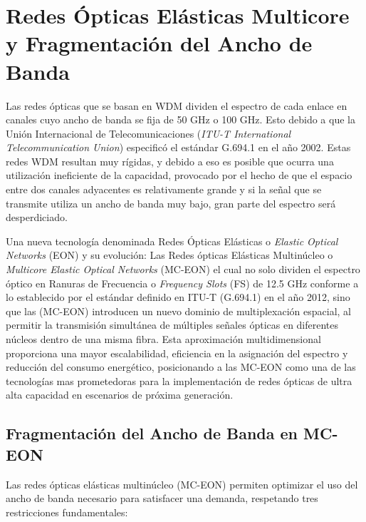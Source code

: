 \chapter{Redes Ópticas Elásticas Multicore y Fragmentación del Ancho de Banda}
Las redes ópticas que se basan en WDM dividen el espectro de cada enlace en canales cuyo ancho de banda se fija de 50 GHz o 100 GHz. Esto debido a que la Unión Internacional de Telecomunicaciones (\textit{ITU-T International Telecommunication Union}) especificó el estándar G.694.1 en el año 2002.
%
Estas redes WDM resultan muy rígidas, y debido a eso es posible que ocurra una utilización ineficiente de la capacidad, provocado por el hecho de que el espacio entre dos canales adyacentes es relativamente grande y si la señal que se transmite utiliza un ancho de banda muy bajo, gran parte del espectro será desperdiciado.
%

Una nueva tecnología denominada Redes Ópticas Elásticas o \textit{Elastic Optical Networks} (EON) y su evolución: Las Redes ópticas Elásticas Multinúcleo o \textit{Multicore Elastic Optical Networks} (MC-EON) el cual no solo dividen el espectro óptico en Ranuras de Frecuencia o \textit{Frequency Slots} (FS) de 12.5 GHz conforme a lo establecido por el estándar definido en ITU-T (G.694.1) en el año 2012, sino que las (MC-EON) introducen un nuevo dominio de multiplexación espacial, al permitir la transmisión simultánea de múltiples señales ópticas en diferentes núcleos dentro de una misma fibra.
%
Esta aproximación multidimensional proporciona una mayor escalabilidad, eficiencia en la asignación del espectro y reducción del consumo energético, posicionando a las MC-EON como una de las tecnologías mas prometedoras para la implementación de redes ópticas de ultra alta capacidad en escenarios de próxima generación.
%




\section{Fragmentación del Ancho de Banda en MC-EON}
Las redes ópticas elásticas multinúcleo (MC-EON) permiten optimizar el uso del ancho de banda necesario para satisfacer una demanda, respetando tres restricciones fundamentales:
%

